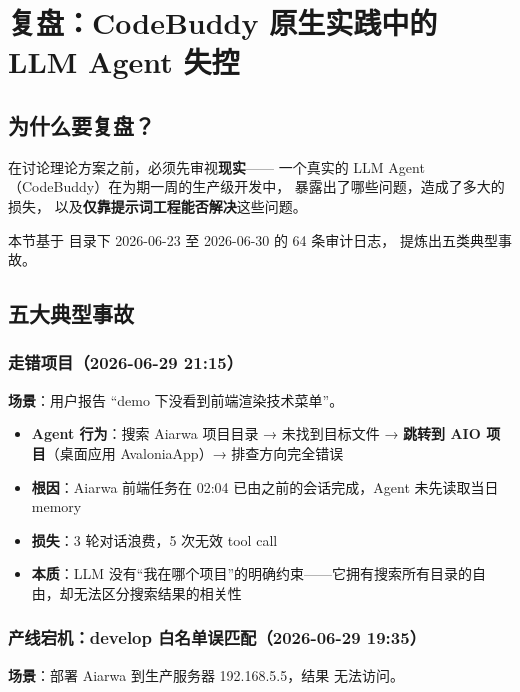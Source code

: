 \documentclass[10pt, openany]{book}
\begin{document}
\chapter{复盘：CodeBuddy 原生实践中的 LLM Agent 失控}

\section{为什么要复盘？}

在讨论理论方案之前，必须先审视\textbf{现实}——
一个真实的 LLM Agent（CodeBuddy）在为期一周的生产级开发中，
暴露出了哪些问题，造成了多大的损失，
以及\textbf{仅靠提示词工程能否解决}这些问题。

本节基于  目录下
2026-06-23 至 2026-06-30 的 64 条审计日志，
提炼出五类典型事故。

\section{五大典型事故}

\subsection{走错项目（2026-06-29 21:15）}

\textbf{场景}：用户报告 ``demo 下没看到前端渲染技术菜单''。

\begin{itemize}
    \item \textbf{Agent 行为}：搜索 Aiarwa 项目目录 → 未找到目标文件 →
        \textbf{跳转到 AIO 项目}（桌面应用 AvaloniaApp）→
        排查方向完全错误
    \item \textbf{根因}：Aiarwa 前端任务在 02:04 已由之前的会话完成，Agent 未先读取当日 memory
    \item \textbf{损失}：3 轮对话浪费，5 次无效 tool call
    \item \textbf{本质}：LLM 没有``我在哪个项目''的明确约束——它拥有搜索所有目录的自由，却无法区分搜索结果的相关性~\cite{Yao2023ReAct}
\end{itemize}

\subsection{产线宕机：develop 白名单误匹配（2026-06-29 19:35）}

\textbf{场景}：部署 Aiarwa 到生产服务器 192.168.5.5，结果  无法访问。
\end{document}

